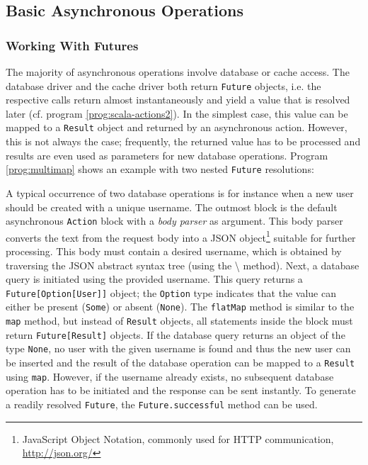 \subsection{Basic Asynchronous Operations}
\label{lab:basicasync}



\subsubsection*{Working With Futures}
The majority of asynchronous operations involve database or cache access. The database driver and the cache driver both return \texttt{Future} objects, i.e. the respective calls return almost instantaneously and yield a value that is resolved later (cf. program \ref{prog:scala-actions2}). In the simplest case, this value can be mapped to a \texttt{Result} object and returned by an asynchronous action. However, this is not always the case; frequently, the returned value has to be processed and results are even used as parameters for new database operations. Program \ref{prog:multimap} shows an example with two nested \texttt{Future} resolutions: 

A typical occurrence of two database operations is for instance when a new user should be created with a unique username. The outmost block is the default asynchronous \texttt{Action} block with a \textit{body parser} as argument. This body parser converts the text from the request body into a JSON  object\footnote{JavaScript Object Notation, commonly used for HTTP communication, \url{http://json.org/}} suitable for further processing. This body must contain a desired username, which is obtained by traversing the JSON abstract syntax tree (using the \textbackslash{} method). Next, a database query is initiated using the provided username. This query returns a \texttt{Future[Option[User]]} object; the \texttt{Option} type indicates that the value can either be present (\texttt{Some}) or absent (\texttt{None}). The \texttt{flatMap} method is similar to the \texttt{map} method, but instead of \texttt{Result} objects, all statements inside the block must return \texttt{Future[Result]} objects. If the database query returns an object of the type \texttt{None}, no user with the given username is found and thus the new user can be inserted and the result of the database operation can be mapped to a \texttt{Result} using \texttt{map}. However, if the username already exists, no subsequent database operation has to be initiated and the response can be sent instantly. To generate a readily resolved \texttt{Future}, the \texttt{Future.successful} method can be used.

